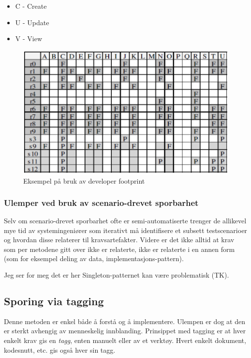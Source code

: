\begin{itemize}
\item
  C - Create
\item
  U - Update
\item
  V - View
\end{itemize}
\begin{figure}[htbp]
\centering
\includegraphics{Forelesning 03/img/6.png}
\caption{Eksempel på bruk av developer footprint}
\end{figure}

\subsubsection{Ulemper ved bruk av scenario-drevet sporbarhet}

Selv om scenario-drevet sporbarhet ofte er semi-automatiserte trenger de
allikevel mye tid av systemingeniører som iterativt må identifisere et
subsett testscenarioer og hvordan disse relaterer til kravsartefakter.
Videre er det ikke alltid at krav som per metodene gitt over ikke er
relaterte, ikke er relaterte i en annen form (som for eksempel deling av
data, implementasjons-pattern).

Jeg ser for meg det er her Singleton-patternet kan være problematisk
(TK).

\subsection{Sporing via tagging}

Denne metoden er enkel både å forstå og å implementere. Ulempen er dog
at den er sterkt avhengig av menneskelig innblanding. Prinsippet med
tagging er at hver enkelt krav gis en \emph{tagg}, enten manuelt eller
av et verktøy. Hvert enkelt dokument, kodesnutt, etc. gis også hver sin
tagg.

